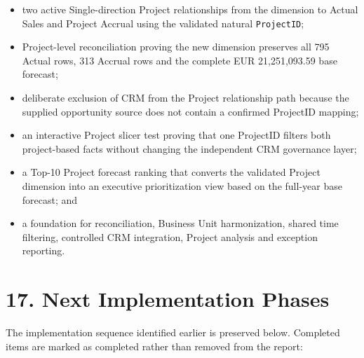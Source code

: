 \documentclass[11pt,a4paper]{article}
\begin{document}
\begin{itemize}[leftmargin=7mm,itemsep=3pt]
    \item two active Single-direction Project relationships from the dimension to
    Actual Sales and Project Accrual using the validated natural \texttt{ProjectID};
    \item Project-level reconciliation proving the new dimension preserves all
    795 Actual rows, 313 Accrual rows and the complete EUR 21,251,093.59 base forecast;
    \item deliberate exclusion of CRM from the Project relationship path because the
    supplied opportunity source does not contain a confirmed ProjectID mapping;
    \item an interactive Project slicer test proving that one ProjectID filters both
    project-based facts without changing the independent CRM governance layer;
    \item a Top-10 Project forecast ranking that converts the validated Project dimension
    into an executive prioritization view based on the full-year base forecast; and
    \item a foundation for reconciliation, Business Unit harmonization, shared
    time filtering, controlled CRM integration, Project analysis and exception reporting.
\end{itemize}


\section{17. Next Implementation Phases}

The implementation sequence identified earlier is preserved below. Completed
items are marked as completed rather than removed from the report:
\end{document}
